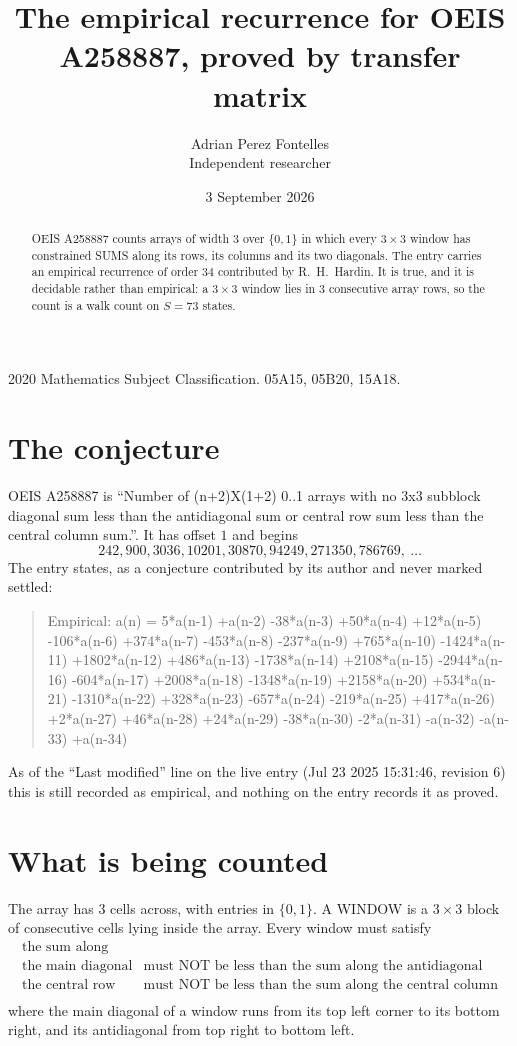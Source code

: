 \documentclass[11pt,a4paper]{article}
\title{The empirical recurrence for OEIS A258887, proved by transfer matrix}
\author{Adrian Perez Fontelles\\ \small Independent researcher}
\date{3 September 2026}
\theoremstyle{plain}
\theoremstyle{definition}
\begin{document}
\maketitle

\begin{abstract}
OEIS A258887 counts arrays of width $3$ over $\{0,1\}$ in which every $3\times3$ window has
constrained SUMS along its rows, its columns and its two diagonals. The entry carries an
empirical recurrence of order $34$ contributed by R.~H.~Hardin. It is true, and it is
decidable rather than empirical: a $3\times3$ window lies in $3$ consecutive array rows,
so the count is a walk count on $S=73$ states.
\end{abstract}

\noindent\small 2020 Mathematics Subject Classification. 05A15, 05B20, 15A18.\normalsize

\section{The conjecture}

OEIS A258887 is ``Number of (n+2)X(1+2) 0..1 arrays with no 3x3 subblock diagonal sum less than the antidiagonal sum or central row sum less than the central column sum.''. It has offset $1$ and begins
\[
242, 900, 3036, 10201, 30870, 94249, 271350, 786769,\ \dots
\]
The entry states, as a conjecture contributed by its author and never marked settled:
\begin{quote}
Empirical: a(n) = 5*a(n-1) +a(n-2) -38*a(n-3) +50*a(n-4) +12*a(n-5) -106*a(n-6) +374*a(n-7) -453*a(n-8) -237*a(n-9) +765*a(n-10) -1424*a(n-11) +1802*a(n-12) +486*a(n-13) -1738*a(n-14) +2108*a(n-15) -2944*a(n-16) -604*a(n-17) +2008*a(n-18) -1348*a(n-19) +2158*a(n-20) +534*a(n-21) -1310*a(n-22) +328*a(n-23) -657*a(n-24) -219*a(n-25) +417*a(n-26) +2*a(n-27) +46*a(n-28) +24*a(n-29) -38*a(n-30) -2*a(n-31) -a(n-32) -a(n-33) +a(n-34)
\end{quote}
As of the ``Last modified'' line on the live entry (Jul 23 2025 15:31:46, revision 6) this is still
recorded as empirical, and nothing on the entry records it as proved.

\section{What is being counted}

The array has $3$ cells across, with entries in $\{0,1\}$. A WINDOW is a $3\times3$ block
of consecutive cells lying inside the array. Every window must satisfy
\[
\begin{array}{ll}
\text{the sum along} & \text{} \\[2pt]
\text{the main diagonal} & \text{must NOT be less than the sum along the antidiagonal} \\
\text{the central row} & \text{must NOT be less than the sum along the central column} \\
\end{array}
\]
where the main diagonal of a window runs from its top left corner to its bottom right, and its
antidiagonal from top right to bottom left.
\end{document}
